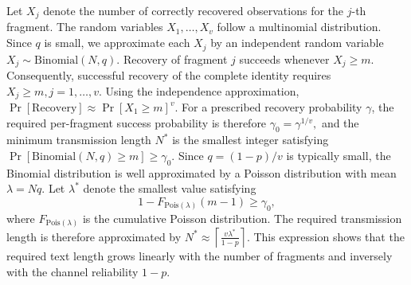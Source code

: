 \documentclass[a4paper,11pt]{llncs}
\begin{document}
Let $X_j$ denote the number of correctly recovered observations for the
$j$-th fragment. The random variables
$X_1,\ldots,X_v$ follow a multinomial distribution. Since $q$ is small,
we approximate each $X_j$ by an independent random variable
$
X_j\sim\mathrm{Binomial}(N,q).
$
Recovery of fragment $j$ succeeds whenever $X_j\ge m$.
Consequently, successful recovery of the complete identity requires
$
X_j\ge m,  j=1,\ldots,v.
$
Using the independence approximation,
$
\Pr[\text{Recovery}]
\approx
\Pr[X_1\ge m]^v.
$
For a prescribed recovery probability $\gamma$, the required
per-fragment success probability is therefore
$
\gamma_0=\gamma^{1/v},
$
and the minimum transmission length $N^*$ is the smallest integer
satisfying
$
\Pr[\mathrm{Binomial}(N,q)\ge m]\ge\gamma_0.
$
Since $q=(1-p)/v$ is typically small, the Binomial distribution is well
approximated by a Poisson distribution with mean
$
\lambda=Nq.
$
Let $\lambda^*$ denote the smallest value satisfying
\[
1-F_{\mathrm{Pois}(\lambda)}(m-1)\ge\gamma_0,
\]
where $F_{\mathrm{Pois}(\lambda)}$ is the cumulative Poisson
distribution.
The required transmission length is therefore approximated by
$
N^*
\approx
\left\lceil
\frac{v\lambda^*}{1-p}
\right\rceil.
$
This expression shows that the required text length grows linearly with
the number of fragments and inversely with the channel reliability
$1-p$.
\end{document}
